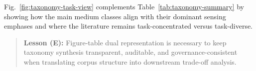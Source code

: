 Fig.~\ref{fig:taxonomy-task-view} complements Table~\ref{tab:taxonomy-summary} by showing how the main medium classes align with their dominant sensing emphases and where the literature remains task-concentrated versus task-diverse.

\begin{quote}
\textbf{Lesson (E):} Figure-table dual representation is necessary to keep taxonomy synthesis transparent, auditable, and governance-consistent when translating corpus structure into downstream trade-off analysis.
\end{quote}
